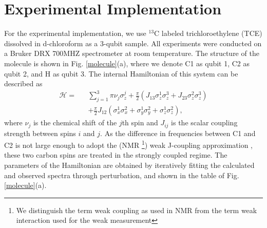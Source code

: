 \documentclass[aps,pra,12pt,onecolumn,showpacs,superscriptaddress,floatfix,footinbib,subfigure]{revtex4}
\begin{document}
\section{Experimental Implementation}
For the experimental implementation, we use $^{13}$C labeled trichloroethylene (TCE) dissolved in d-chloroform as a 3-qubit sample. All experiments were conducted on a Bruker DRX 700MHZ spectrometer at room temperature. The structure of the molecule is shown in Fig. \ref{molecule}(a), where we denote C1 as qubit 1, C2 as qubit 2, and H as qubit 3. The internal Hamiltonian of this system can be described as
\begin{eqnarray}\label{Hamiltonian}
\mathcal{H}=&&\sum\limits_{j=1}^3 {\pi \nu _j } \sigma _z^j  + \frac{\pi}{2}(J_{13}\sigma _z^1 \sigma _z^3+J_{23}\sigma _z^2 \sigma _z^3) \nonumber\\
&&+ \frac{\pi}{2}J_{12} (\sigma _x^1 \sigma _x^2+\sigma _y^1 \sigma _y^2+\sigma _z^1 \sigma _z^2),
\end{eqnarray}
where $\nu_j$ is the chemical shift of the $j$th spin and $J_{ij}$ is the scalar coupling strength between spins $i$ and $j$. As the difference in frequencies between C1 and C2 is not large enough to adopt the (NMR \footnote{We distinguish the term weak coupling as used in NMR from the term weak interaction used for the weak measurement}) weak J-coupling  approximation \cite{nmrreview}, these two carbon spins are treated in the strongly coupled regime. The parameters of the Hamiltonian are obtained by iteratively fitting the calculated and observed spectra through perturbation, and shown in the table of Fig. \ref{molecule}(a).
\end{document}
